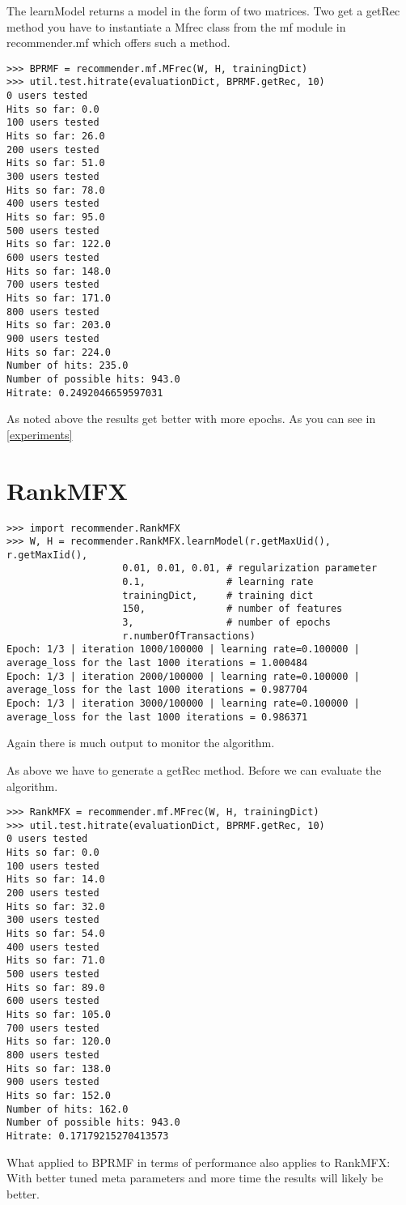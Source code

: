 The learnModel returns a model in the form of two matrices. Two get a 
getRec method you have to instantiate a Mfrec class from the mf module
in recommender.mf which offers such a method.
\begin{lstlisting}
>>> BPRMF = recommender.mf.MFrec(W, H, trainingDict)
>>> util.test.hitrate(evaluationDict, BPRMF.getRec, 10)
0 users tested
Hits so far: 0.0
100 users tested
Hits so far: 26.0
200 users tested
Hits so far: 51.0
300 users tested
Hits so far: 78.0
400 users tested
Hits so far: 95.0
500 users tested
Hits so far: 122.0
600 users tested
Hits so far: 148.0
700 users tested
Hits so far: 171.0
800 users tested
Hits so far: 203.0
900 users tested
Hits so far: 224.0
Number of hits: 235.0
Number of possible hits: 943.0
Hitrate: 0.2492046659597031
\end{lstlisting}
As noted above the results get better with more epochs. As you can see
in \ref{experiments}

\section{RankMFX}
\begin{lstlisting}
>>> import recommender.RankMFX
>>> W, H = recommender.RankMFX.learnModel(r.getMaxUid(), r.getMaxIid(),
                    0.01, 0.01, 0.01, # regularization parameter
                    0.1,              # learning rate
                    trainingDict,     # training dict
                    150,              # number of features
                    3,                # number of epochs
                    r.numberOfTransactions)
Epoch: 1/3 | iteration 1000/100000 | learning rate=0.100000 | average_loss for the last 1000 iterations = 1.000484
Epoch: 1/3 | iteration 2000/100000 | learning rate=0.100000 | average_loss for the last 1000 iterations = 0.987704
Epoch: 1/3 | iteration 3000/100000 | learning rate=0.100000 | average_loss for the last 1000 iterations = 0.986371
\end{lstlisting}
Again there is much output to monitor the algorithm.

As above we have to generate a getRec method. Before we can evaluate the algorithm.
\begin{lstlisting}
>>> RankMFX = recommender.mf.MFrec(W, H, trainingDict)
>>> util.test.hitrate(evaluationDict, BPRMF.getRec, 10)
0 users tested
Hits so far: 0.0
100 users tested
Hits so far: 14.0
200 users tested
Hits so far: 32.0
300 users tested
Hits so far: 54.0
400 users tested
Hits so far: 71.0
500 users tested
Hits so far: 89.0
600 users tested
Hits so far: 105.0
700 users tested
Hits so far: 120.0
800 users tested
Hits so far: 138.0
900 users tested
Hits so far: 152.0
Number of hits: 162.0
Number of possible hits: 943.0
Hitrate: 0.17179215270413573
\end{lstlisting}
What applied to BPRMF in terms of performance also applies to RankMFX:
With better tuned meta parameters and more time the results will likely
be better.


